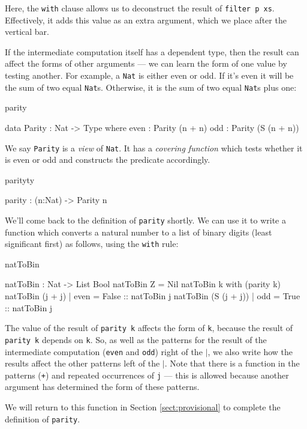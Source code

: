 \noindent
Here, the \texttt{with} clause allows us to deconstruct the result of 
\texttt{filter p xs}.
Effectively, it adds this value as an extra argument, which we place after the
vertical bar.

If the intermediate computation itself has a dependent type, then the result
can affect the forms of other arguments --- we can learn the form of one value by
testing another. For example, a \texttt{Nat} is either even or odd. If it's even it will
be the sum of two equal \texttt{Nat}s. Otherwise, it is the sum of two equal \texttt{Nat}s 
plus one:

\begin{SaveVerbatim}{parity}

data Parity : Nat -> Type where
   even : Parity (n + n)
   odd  : Parity (S (n + n))

\end{SaveVerbatim}

\noindent
We say \texttt{Parity} is a \emph{view} of \texttt{Nat}. 
It has a \emph{covering function} which tests whether
it is even or odd and constructs the predicate accordingly.

\begin{SaveVerbatim}{parityty}

parity : (n:Nat) -> Parity n

\end{SaveVerbatim}

\label{sect:nattobin}

\noindent
We'll come back to the definition of \texttt{parity} shortly. We can use it
to write a function which converts a natural number to a list of binary digits
(least significant first) as follows, using the \texttt{with} rule:

\begin{SaveVerbatim}{natToBin}

natToBin : Nat -> List Bool
natToBin Z = Nil
natToBin k with (parity k)
   natToBin (j + j)     | even = False :: natToBin j
   natToBin (S (j + j)) | odd  = True  :: natToBin j

\end{SaveVerbatim}

\noindent
The value of the result of \texttt{parity k} affects the form of \texttt{k}, 
because the result
of \texttt{parity k} depends on \texttt{k}. 
So, as well as the patterns for the result of the
intermediate computation (\texttt{even} and \texttt{odd}) right of the 
\texttt{$\mid$}, we also write how
the results affect the other patterns left of the $\mid$. Note that there is a
function in the patterns (\texttt{+}) and repeated occurrences of \texttt{j} --- 
this is allowed
because another argument has determined the form of these patterns.

We will return to this function in Section \ref{sect:provisional} to complete
the definition of \texttt{parity}.


